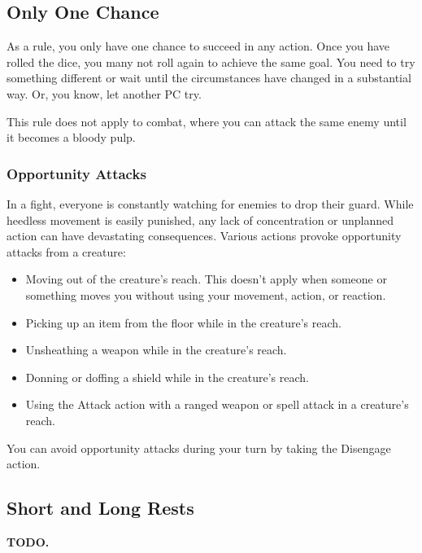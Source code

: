 \subsection*{Only One Chance} \label{ssec::onlyonechance}
    As a rule, you only have one chance to succeed in any action.
    Once you have rolled the dice, you many not roll again to achieve the same goal.
    You need to try something different or wait until the circumstances have changed in a substantial way.
    Or, you know, let another PC try.

    This rule does not apply to combat, where you can attack the same enemy until it becomes a bloody pulp.

\subsubsection*{Opportunity Attacks} \label{rule::opportunityattacks}
    In a fight, everyone is constantly watching for enemies to drop their guard.
    While heedless movement is easily punished, any lack of concentration or unplanned action can have devastating consequences.
    Various actions provoke opportunity attacks from a creature:
    \begin{itemize}
        \item Moving out of the creature's reach.
        This doesn't apply when someone or something moves you without using your movement, action, or reaction.
        \item Picking up an item from the floor while in the creature's reach.
        \item Unsheathing a weapon while in the creature's reach.
        \item Donning or doffing a shield while in the creature's reach.
        \item Using the Attack action with a ranged weapon or spell attack in a creature's reach.
    \end{itemize}
    You can avoid opportunity attacks during your turn by taking the Disengage action.

\subsection*{Short and Long Rests} \label{ssec::shortandlongrests}
    \textbf{TODO.}
